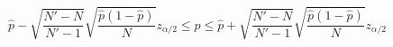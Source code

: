 

\[
\hat{p} - \sqrt{\frac{N'-N}{N'-1}}\sqrt{\frac{\hat{p}(1 - \hat{p})}{N}} z_{\alpha/2} \le p \le \hat{p} + \sqrt{\frac{N'-N}{N'-1}}\sqrt{\frac{\hat{p}(1 - \hat{p})}{N}} z_{\alpha/2}
\]


